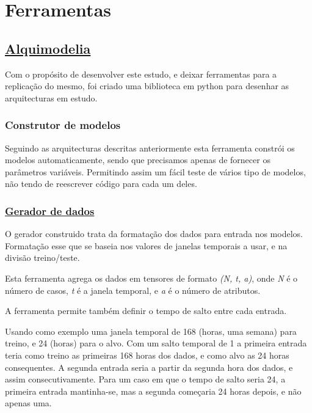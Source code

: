 \chapter{Ferramentas}

\section{\href{https://github.com/alquimodelia/alquimodelia}{Alquimodelia}\label{se:alquimodelia}}


Com o propósito de desenvolver este estudo, e deixar ferramentas para a replicação do mesmo, foi criado uma biblioteca em python para desenhar as arquitecturas em estudo.\par

\subsection{Construtor de modelos}

Seguindo as arquitecturas descritas anteriormente esta ferramenta constrói os modelos automaticamente, sendo que precisamos apenas de fornecer os parâmetros variáveis. Permitindo assim um fácil teste de vários tipo de modelos, não tendo de reescrever código para cada um deles.\par

\subsection{\href{https://github.com/alquimodelia/alquitable/blob/main/alquitable/generator.py}{Gerador de dados}}

O gerador construido trata da formatação dos dados para entrada nos modelos. Formatação esse que se baseia nos valores de janelas temporais a usar, e na divisão treino/teste.\par
Esta ferramenta agrega os dados em tensores de formato \textit{(N, t, a)}, onde \textit{N} é o número de casos, \textit{t} é a janela temporal, e \textit{a} é o número de atributos.\par
A ferramenta permite também definir o tempo de salto entre cada entrada.\par
Usando como exemplo uma janela temporal de 168 (horas, uma semana) para treino, e 24 (horas) para o alvo. Com um salto temporal de 1 a primeira entrada teria como treino as primeiras 168 horas dos dados, e como alvo as 24 horas consequentes. A segunda entrada seria a partir da segunda hora dos dados, e assim consecutivamente. Para um caso em que o tempo de salto seria 24, a primeira entrada mantinha-se, mas a segunda começaria 24 horas depois, e não apenas uma.\par


